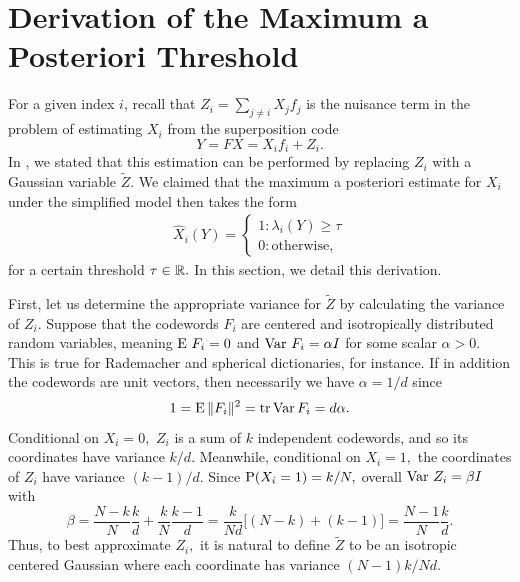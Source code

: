 \section{Derivation of the Maximum a Posteriori Threshold} \label{appendix:threshold}

For a given index $i$, recall that $Z_i = \sum_{j \neq i} X_j f_j$ is the nuisance term in the problem of estimating $X_i$ from the superposition code
$$
Y = F X = X_i f_i + Z_i.
$$
In , we stated that this estimation can be performed by replacing $Z_i$ with a Gaussian variable $\tilde Z.$ We claimed that the maximum a posteriori estimate for $X_i$ under the simplified model then takes the form
\begin{align}
\hat X_i(Y) = \begin{cases}
1 \colon \lambda_i(Y) \ge \tau \\ 0 \colon \text{otherwise},
\end{cases}
\end{align}
for a certain threshold $\tau \in \mathbb{R}.$ In this section, we detail this derivation.

First, let us determine the appropriate variance for $\tilde Z$ by calculating the variance of $Z_i.$ Suppose that the codewords $F_i$ are centered and isotropically distributed random variables, meaning $\operatorname{E}\, F_i = 0$ and $\operatorname{Var}\, F_i = \alpha I$ for some scalar $\alpha > 0.$ This is true for Rademacher and spherical dictionaries, for instance. If in addition the codewords are unit vectors, then necessarily we have $\alpha = 1/d$ since
$$
1 = \operatorname{E}\, \lVert F_i \rVert^2 = \operatorname{tr} \operatorname{Var} F_i = d \alpha.
$$
Conditional on $X_i = 0,$ $Z_i$ is a sum of $k$ independent codewords, and so its coordinates have variance $k/d.$ Meanwhile, conditional on $X_i = 1,$ the coordinates of $Z_i$ have variance $(k - 1)/d.$ Since $\operatorname{P}(X_i = 1) = k/N,$ overall $\operatorname{Var}\, Z_i = \beta I$ with
$$
\beta = \frac{N - k}{N} \frac k d + \frac k N \frac{k - 1}{d} = \frac{k}{Nd}\big[(N - k) + (k - 1)\big] = \frac{N - 1}{N} \frac k d.
$$
Thus, to best approximate $Z_i,$ it is natural to define $\tilde Z$ to be an isotropic centered Gaussian where each coordinate has variance $(N - 1)k/Nd.$

